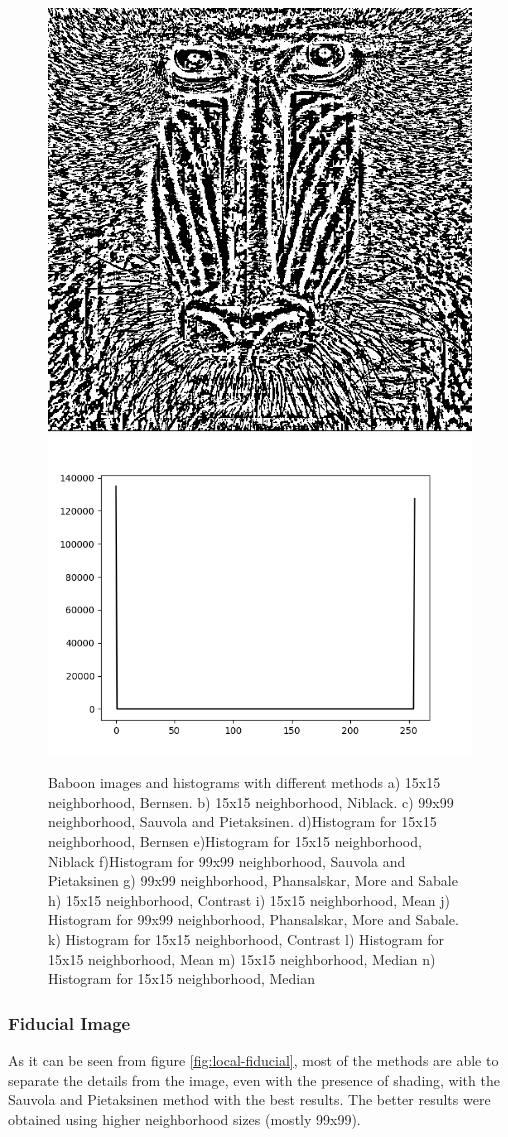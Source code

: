 \documentclass[]{IEEEtran}
\begin{document}
\begin{figure}[h]
  \includegraphics[width=0.3\hsize]{images/15x15-window/baboon_median.png}
  \includegraphics[width=0.3\hsize]{images/15x15-window/baboon_median_histogram.png}

  \caption{Baboon images and histograms with different methods a) 15x15 neighborhood, Bernsen. b) 15x15 neighborhood, Niblack. c) 99x99 neighborhood, Sauvola and Pietaksinen. d)Histogram for 15x15 neighborhood, Bernsen e)Histogram for 15x15 neighborhood, Niblack f)Histogram for 99x99 neighborhood, Sauvola and Pietaksinen g) 99x99 neighborhood, Phansalskar, More and Sabale h) 15x15 neighborhood, Contrast i) 15x15 neighborhood, Mean j) Histogram for 99x99 neighborhood, Phansalskar, More and Sabale. k) Histogram for 15x15 neighborhood, Contrast l) Histogram for 15x15 neighborhood, Mean m) 15x15 neighborhood, Median n) Histogram for 15x15 neighborhood, Median}
  \label{fig:local-baboon}
\end{figure}

\subsubsection{Fiducial Image}
As it can be seen from figure \ref{fig:local-fiducial}, most of the methods are able to separate the details from the image, even with the presence of shading,   with the Sauvola and Pietaksinen method with the best results. The better results were obtained using higher neighborhood sizes (mostly 99x99).
\end{document}
